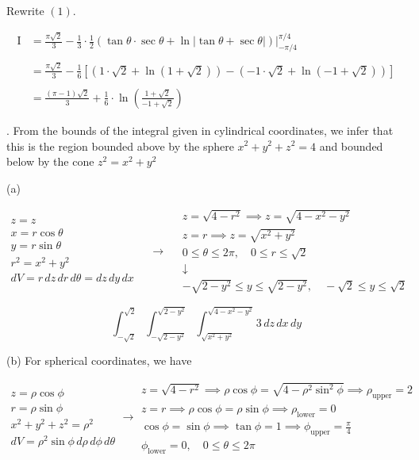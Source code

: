 \documentclass{article}
\begin{document}
\hfill

\noindent Rewrite $(1)$.

\begin{align*}\mathrm{I}&=\frac{\pi\sqrt2}3-\frac13\cdot\frac12\left(\tan\theta\cdot\sec\theta+\ln\left|\tan\theta+\sec\theta\right|\right)\bigg|_{-\pi/4}^{\pi/4}\\\\&=\frac{\pi\sqrt2}3-\frac16\left[\left(1\cdot\sqrt2+\ln\left(1+\sqrt2\right)\right)-\left(-1\cdot\sqrt2+\ln\left(-1+\sqrt2\right)\right)\right]\\\\&=\boxed{\frac{(\pi-1)\sqrt2}3+\frac16\cdot\ln\left(\frac{1+\sqrt2}{-1+\sqrt2}\right)}\end{align*}

\hfill

. From the bounds of the integral given in cylindrical coordinates, we infer that this is the region bounded above by the sphere $x^2+y^2+z^2=4$ and bounded below by the cone $z^2=x^2+y^2$ 

\hfill

\noindent (a)

\[
\begin{array}{c}
z=z\\
x=r\cos\theta\\
y=r\sin\theta\\
r^2=x^2+y^2\\
dV=r\,dz\,dr\,d\theta=dz\,dy\,dx
\end{array}\quad\rightarrow\quad
\begin{array}{c}
z=\sqrt{4-r^2}\implies z=\sqrt{4-x^2-y^2}\\
z=r\implies z=\sqrt{x^2+y^2}\\[1em]
0\leq\theta\leq2\pi,\quad 0\leq r\leq\sqrt2\\[0.2cm]
\downarrow\\[0.2cm]
-\sqrt{2-y^2}\leq y\leq\sqrt{2-y^2},\quad -\sqrt2\leq y\leq\sqrt2
\end{array}
\]

\[\boxed{\int_{-\sqrt2}^{\sqrt2}\int_{-\sqrt{2-y^2}}^{\sqrt{2-y^2}}\int_{\sqrt{x^2+y^2}}^{\sqrt{4-x^2-y^2}}3\,dz\,dx\,dy}\]

\hfill

\noindent (b) For spherical coordinates, we have

\[
\begin{array}{c}
z=\rho\cos\phi\\
r=\rho\sin\phi\\
x^2+y^2+z^2=\rho^2\\
dV=\rho^2\sin\phi\,d\rho\,d\phi\,d\theta
\end{array}\rightarrow
\begin{array}{c}
z=\sqrt{4-r^2}\implies\rho\cos\phi=\sqrt{4-\rho^2\sin^2\phi}\implies\rho_{\text{upper}}=2\\
z=r\implies\rho\cos\phi=\rho\sin\phi\implies\rho_{\text{lower}}=0\\[1em]
\displaystyle\cos\phi=\sin\phi\implies\tan\phi=1\implies\phi_{\text{upper}}=\frac\pi4\\
\phi_{\text{lower}}=0,\quad 0\leq\theta\leq2\pi
\end{array}
\]
\end{document}
